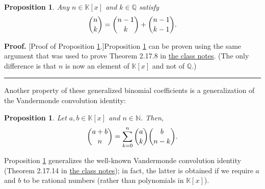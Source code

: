 \documentclass[paper=a4, fontsize=12pt]{scrartcl}%
\let\sumnonlimits\sum
\renewcommand{\sum}{\sumnonlimits\limits}
\theoremstyle{plainsl}
\newtheorem{proposition}[theorem]{Proposition}
\theoremstyle{definition}
\theoremstyle{remark}
\newenvironment{proof}[1][Proof]{\noindent\textbf{#1.} }{\ \rule{0.5em}{0.5em}}
\begin{document}
\begin{proposition}
\label{prop.pol.general-binom.rec}Any $n\in\mathbb{K}\left[  x\right]  $ and
$k\in\mathbb{Q}$ satisfy
\[
\dbinom{n}{k}=\dbinom{n-1}{k}+\dbinom{n-1}{k-1}.
\]

\end{proposition}

\begin{proof}
[Proof of Proposition \ref{prop.pol.general-binom.rec}.]Proposition
\ref{prop.pol.general-binom.rec} can be proven using the same argument that
was used to prove Theorem 2.17.8 in
\href{http://www.cip.ifi.lmu.de/~grinberg/t/19s/notes.pdf}{the class notes}.
(The only difference is that $n$ is now an element of $\mathbb{K}\left[
x\right]  $ and not of $\mathbb{Q}$.)
\end{proof}

Another property of these generalized binomial coefficients is a
generalization of the Vandermonde convolution identity:

\begin{proposition}
\label{prop.pol.general-binom.vander}Let $a,b\in\mathbb{\mathbb{\mathbb{K}}%
}\left[  x\right]  $ and $n\in\mathbb{N}$. Then,%
\[
\dbinom{a+b}{n}=\sum_{k=0}^{n}\dbinom{a}{k}\dbinom{b}{n-k}.
\]

\end{proposition}

Proposition \ref{prop.pol.general-binom.vander} generalizes the well-known
Vandermonde convolution identity (Theorem 2.17.14 in
\href{http://www.cip.ifi.lmu.de/~grinberg/t/19s/notes.pdf}{the class notes});
in fact, the latter is obtained if we require $a$ and $b$ to be rational
numbers (rather than polynomials in $\mathbb{K}\left[  x\right]  $).
\end{document}
